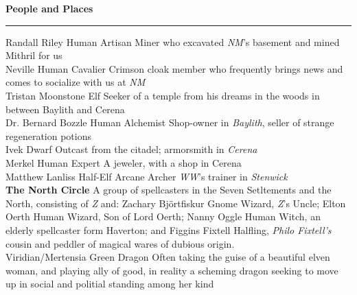 \documentclass[letterpaper]{article}
\newcommand{\e}[1]{\emph{#1}}
\newcommand{\B}[1]{\textbf{#1}}
\newenvironment{notesection}[1]
{ {\huge \B{#1}}\hrule\vspace{0.5em}\begingroup\fontsize{9pt}{12pt}\selectfont}
{\endgroup}
\newcommand{\person}[3]{#1\B{
    \ifstrequal{#2}{M}{{\color{ProcessBlue}\male}}{%
    \ifstrequal{#2}{F}{\color{VioletRed}\female}{}}} #3}
\begin{document}
\begin{notesection}{People and Places}
\person{Randall Riley}{M}{Human Artisan} Miner who excavated \e{NM}'s basement and mined Mithril for us\\
\person{Neville}{M}{Human Cavalier} Crimson cloak member who frequently brings news and comes to socialize with us at \e{NM}\\
\person{Tristan Moonstone}{M}{Elf} Seeker of a temple from his dreams in the woods in between Baylith and Cerena\\
\person{Dr. Bernard Bozzle}{M}{Human Alchemist} Shop-owner in \e{Baylith}, seller of strange regeneration potions\\
\person{Ivek}{M}{Dwarf} Outcast from the citadel; armorsmith in \e{Cerena}\\
\person{Merkel}{F}{Human Expert} A jeweler, with a shop in Cerena\\
\person{Matthew Lanliss}{M}{Half-Elf Arcane Archer} \e{WW}'s trainer in \e{Stenwick}\\
\B{The North Circle} A group of spellcasters in the Seven Setltements and the North, consisting of \e{Z} and: \person{Zachary Bj\"{o}rtfiskur}{M}{Gnome Wizard}, \e{Z}'s Uncle; \person{Elton Oerth}{M}{Human Wizard}, Son of Lord Oerth; \person{Nanny Oggle}{F}{Human Witch}, an elderly spellcaster form Haverton; and \person{Figgins Fixtell}{M}{Halfling}, \e{Philo Fixtell's} cousin and peddler of magical wares of dubious origin. \\
\person{Viridian/Mertensia}{F}{Green Dragon} Often taking the guise of a beautiful elven woman, and playing ally of good, in reality a scheming dragon seeking to move up in social and politial standing among her kind \\


\end{notesection}
\end{document}
